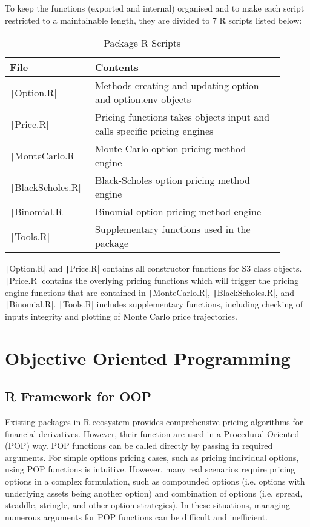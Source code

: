To keep the functions (exported and internal) organised and to make each script restricted to a maintainable length, they are divided to 7 R scripts listed below:

\begin{table}[H]
\begin{tabular}{p{0.25\linewidth} | p{0.65\linewidth}}
File                           & Contents \\ \hline
\texttt|Option.R|       & Methods creating and updating option and option.env objects \\
\texttt|Price.R|        & Pricing functions takes objects input and calls specific pricing engines \\
\texttt|MonteCarlo.R|   & Monte Carlo option pricing method engine \\
\texttt|BlackScholes.R| & Black-Scholes option pricing method engine \\
\texttt|Binomial.R|     & Binomial option pricing method engine \\
\texttt|Tools.R|        & Supplementary functions used in the package
\end{tabular}
\caption{Package R Scripts} \label{tab:pkg_scripts}
\end{table} 

\texttt|Option.R| and \texttt|Price.R| contains all constructor functions for S3 class objects. \texttt|Price.R| contains the overlying pricing functions which will trigger the pricing engine functions that are contained in \texttt|MonteCarlo.R|, \texttt|BlackScholes.R|, and \texttt|Binomial.R|. \texttt|Tools.R| includes supplementary functions, including checking of inputs integrity and plotting of Monte Carlo price trajectories.

\section{Objective Oriented Programming}

\subsection{R Framework for OOP}

Existing packages in R ecosystem provides comprehensive pricing algorithms for financial derivatives. However, their function are used in a Procedural Oriented (POP) way. POP functions can be called directly by passing in required arguments. For simple options pricing cases, such as pricing individual options, using POP functions is intuitive. However, many real scenarios require pricing options in a complex formulation, such as compounded options (i.e. options with underlying assets being another option) and combination of options (i.e. spread, straddle, stringle, and other option strategies). In these situations, managing numerous arguments for POP functions can be difficult and inefficient.

